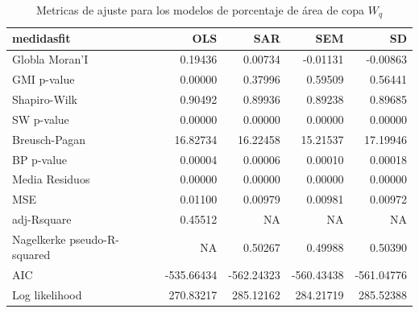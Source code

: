 \documentclass[12pt,a4paper,openany]{book}
\theoremstyle{definition}
\theoremstyle{definition}
\theoremstyle{definition}
\theoremstyle{remark}
\begin{document}
\begin{table}[H]

\caption{\label{tab:tabla-comp-modelos-copaap-wq}Metricas de ajuste para los modelos de porcentaje de área de copa $W_q$}
\centering
\begin{tabular}{lrrrr}
\toprule
medidasfit & OLS & SAR & SEM & SD\\
\midrule
Globla Moran'I & 0.19436 & 0.00734 & -0.01131 & -0.00863\\
GMI p-value & 0.00000 & 0.37996 & 0.59509 & 0.56441\\
Shapiro-Wilk & 0.90492 & 0.89936 & 0.89238 & 0.89685\\
SW p-value & 0.00000 & 0.00000 & 0.00000 & 0.00000\\
Breusch-Pagan & 16.82734 & 16.22458 & 15.21537 & 17.19946\\
\addlinespace
BP p-value & 0.00004 & 0.00006 & 0.00010 & 0.00018\\
Media Residuos & 0.00000 & 0.00000 & 0.00000 & 0.00000\\
MSE & 0.01100 & 0.00979 & 0.00981 & 0.00972\\
adj-Rsquare & 0.45512 & NA & NA & NA\\
Nagelkerke pseudo-R-squared & NA & 0.50267 & 0.49988 & 0.50390\\
\addlinespace
AIC & -535.66434 & -562.24323 & -560.43438 & -561.04776\\
Log likelihood & 270.83217 & 285.12162 & 284.21719 & 285.52388\\
\bottomrule
\end{tabular}
\end{table}
\end{document}
